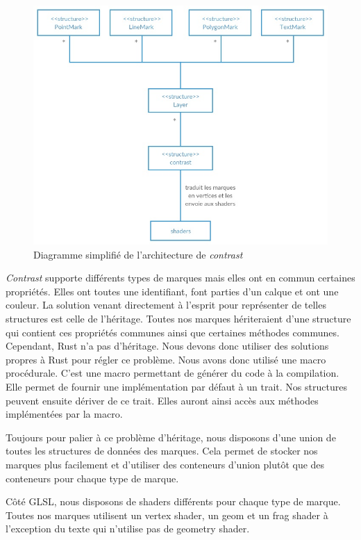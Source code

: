 \documentclass[12pt]{article}
\begin{document}
\begin{figure}[htp]
  \centering
  \includegraphics[scale=1.0]{images/architecture}
  \caption{Diagramme simplifié de l'architecture de \textit{contrast} }
  \label{fig:arch}
\end{figure}

\textit{Contrast} supporte différents types de marques mais elles ont en commun certaines propriétés.
Elles ont toutes une identifiant, font parties d'un calque et ont une couleur.
La solution venant directement à l'esprit pour représenter de telles structures est celle de l'héritage.
Toutes nos marques hériteraient d'une structure qui contient ces propriétés communes ainsi que certaines
méthodes communes.
Cependant, Rust n'a pas d'héritage. Nous devons donc utiliser des solutions propres à Rust pour régler
ce problème.
Nous avons donc utilisé une macro procédurale. C'est une macro permettant de générer du code à la 
compilation. Elle permet de fournir une implémentation par défaut à un trait. Nos structures peuvent
ensuite dériver de ce trait. Elles auront ainsi accès aux méthodes implémentées par la macro.

Toujours pour palier à ce problème d'héritage, nous disposons d'une union de toutes les structures
de données des marques. Cela permet de stocker nos marques plus facilement et d'utiliser des conteneurs d'union plutôt que des conteneurs pour chaque type de marque.

Côté GLSL, nous disposons de shaders différents pour chaque type de marque. Toutes nos marques utilisent un vertex shader, un \gls{geom} et un \gls{frag} shader à l'exception du texte qui n'utilise pas de geometry shader.
\end{document}
